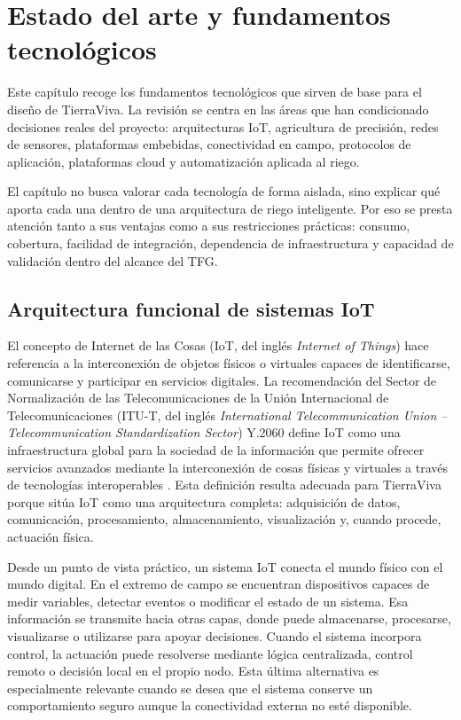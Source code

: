 \chapter{Estado del arte y fundamentos tecnológicos}
\label{cap:capitulo2}

Este capítulo recoge los fundamentos tecnológicos que sirven de base para el diseño de TierraViva. La revisión se centra en las áreas que han condicionado decisiones reales del proyecto: arquitecturas IoT, agricultura de precisión, redes de sensores, plataformas embebidas, conectividad en campo, protocolos de aplicación, plataformas cloud y automatización aplicada al riego.

El capítulo no busca valorar cada tecnología de forma aislada, sino explicar qué aporta cada una dentro de una arquitectura de riego inteligente. Por eso se presta atención tanto a sus ventajas como a sus restricciones prácticas: consumo, cobertura, facilidad de integración, dependencia de infraestructura y capacidad de validación dentro del alcance del TFG.

\section{Arquitectura funcional de sistemas IoT}
\label{sec:arquitecturas_iot}

El concepto de Internet de las Cosas (IoT, del inglés \textit{Internet of Things}) hace referencia a la interconexión de objetos físicos o virtuales capaces de identificarse, comunicarse y participar en servicios digitales. La recomendación del Sector de Normalización de las Telecomunicaciones de la Unión Internacional de Telecomunicaciones (ITU-T, del inglés \textit{International Telecommunication Union -- Telecommunication Standardization Sector}) Y.2060 define IoT como una infraestructura global para la sociedad de la información que permite ofrecer servicios avanzados mediante la interconexión de cosas físicas y virtuales a través de tecnologías interoperables \cite{itu_y2060}. Esta definición resulta adecuada para TierraViva porque sitúa IoT como una arquitectura completa: adquisición de datos, comunicación, procesamiento, almacenamiento, visualización y, cuando procede, actuación física.

Desde un punto de vista práctico, un sistema IoT conecta el mundo físico con el mundo digital. En el extremo de campo se encuentran dispositivos capaces de medir variables, detectar eventos o modificar el estado de un sistema. Esa información se transmite hacia otras capas, donde puede almacenarse, procesarse, visualizarse o utilizarse para apoyar decisiones. Cuando el sistema incorpora control, la actuación puede resolverse mediante lógica centralizada, control remoto o decisión local en el propio nodo. Esta última alternativa es especialmente relevante cuando se desea que el sistema conserve un comportamiento seguro aunque la conectividad externa no esté disponible.

